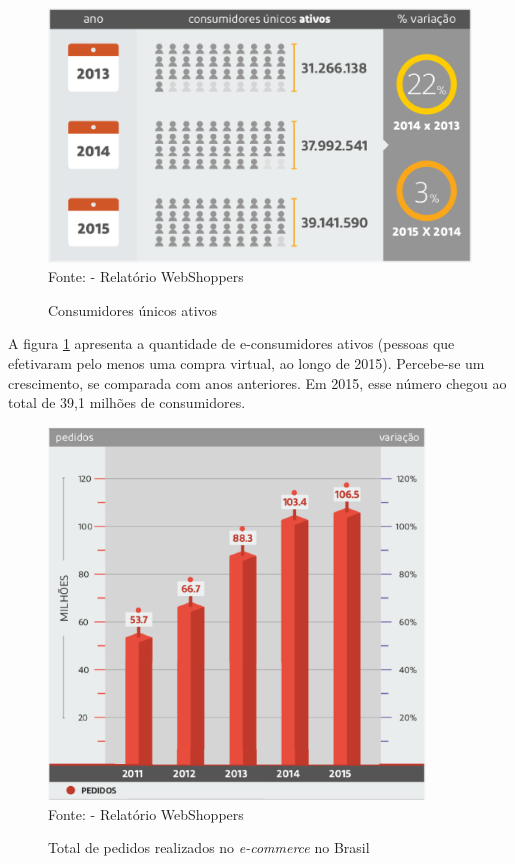 \documentclass[a4paper,12pt]{monografia}
\begin{document}
\begin{figure}[H]
\centering
\caption{Consumidores únicos ativos}
\centering
\includegraphics[width=12cm]{img/webshoppers/consumidores.eps}\\
\small{Fonte:  - Relatório WebShoppers}
\label{figura:consumidores}
\end{figure}

A figura \ref{figura:consumidores} apresenta a quantidade de e-consumidores ativos (pessoas que efetivaram pelo
menos uma compra virtual, ao longo de 2015). Percebe-se um crescimento, se comparada com anos anteriores. Em 2015, esse número chegou ao total de 39,1 milhões de consumidores.

\begin{figure}[H]
\centering
\caption{Total de pedidos realizados no \textit{e-commerce} no Brasil}
\centering
\includegraphics[width=10cm]{img/webshoppers/total-pedidos.eps}\\
\small{Fonte:  - Relatório WebShoppers}
\label{figura:pedidos}
\end{figure}
\end{document}
